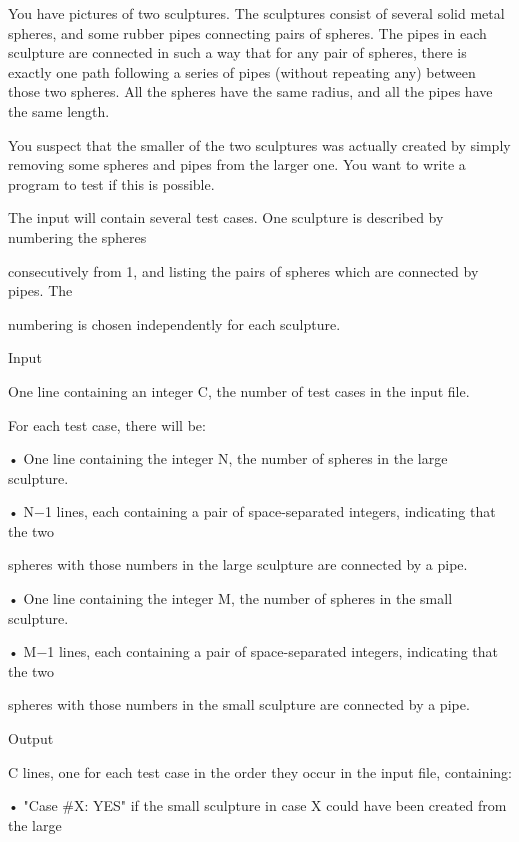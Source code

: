 



   You have pictures of two sculptures. The sculptures consist of several solid metal spheres, and some rubber pipes connecting pairs of spheres. The pipes in each sculpture are connected in such a way that for any pair of spheres, there is exactly one path following a series of pipes (without repeating any) between those two spheres. All the spheres have the same radius, and all the pipes have the same length.  

   You suspect that the smaller of the two sculptures was actually created by simply removing some spheres and pipes from the larger one. You want to write a program to test if this is possible.  

   The input will contain several test cases. One sculpture is described by numbering the spheres   


   consecutively from 1, and listing the pairs of spheres which are connected by pipes. The   


   numbering is chosen independently for each sculpture.  




   Input   


   One line containing an integer C, the number of test cases in the input file.   


   For each test case, there will be:   


   • One line containing the integer N, the number of spheres in the large sculpture.   


   • N−1 lines, each containing a pair of space-separated integers, indicating that the two   


   spheres with those numbers in the large sculpture are connected by a pipe.   


   • One line containing the integer M, the number of spheres in the small sculpture.   


   • M−1 lines, each containing a pair of space-separated integers, indicating that the two   


   spheres with those numbers in the small sculpture are connected by a pipe.  




   Output   


   C lines, one for each test case in the order they occur in the input file, containing:   


   • "Case \#X: YES" if the small sculpture in case X could have been created from the large   


